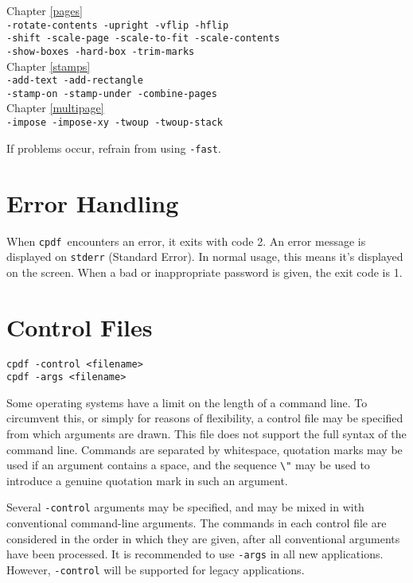 \documentclass{book}
\newcommand{\cpdf}{\texttt{cpdf}}
\begin{document}
\begin{framed}
\small\noindent Chapter \ref{pages}\\
\noindent\small\verb!-rotate-contents -upright -vflip -hflip!\\
\small\verb!-shift -scale-page -scale-to-fit -scale-contents!\\
\small\verb!-show-boxes -hard-box -trim-marks!\\

\noindent Chapter \ref{stamps}\\
\noindent\small\verb!-add-text -add-rectangle!\\
\small\verb!-stamp-on -stamp-under -combine-pages!\\

\noindent Chapter \ref{multipage}\\
\noindent\verb!-impose -impose-xy -twoup -twoup-stack!
\end{framed}

\noindent If problems occur, refrain from using \verb!-fast!.

\section{Error Handling}
When \cpdf\ encounters an error, it exits with code 2. An error message is
displayed on \texttt{stderr} (Standard Error). In normal usage, this means it's
displayed on the screen. When a bad or inappropriate password is given, the exit code is 1.

\section{Control Files}
\begin{framed}
  \noindent\small\verb!cpdf -control <filename>!\\
  \noindent\small\verb!cpdf -args <filename>!
\end{framed}

Some operating systems have a limit on the length of a command line. To
circumvent this, or simply for reasons of flexibility, a control file may be
specified from which arguments are drawn. This file does not support the full
syntax of the command line. Commands are separated by whitespace, quotation
marks may be used if an argument contains a space, and the sequence \verb!\"!
may be used to introduce a genuine quotation mark in such an argument.

Several \verb!-control! arguments may be specified, and may be mixed in with
conventional command-line arguments. The commands in each control file are
considered in the order in which they are given, after all conventional
arguments have been processed. It is recommended to use \texttt{-args} in all new applications. However, \texttt{-control} will be supported for legacy applications.
\end{document}
